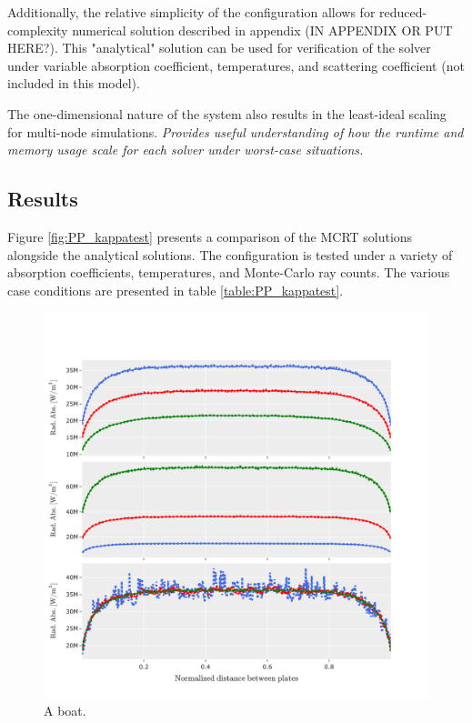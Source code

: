 Additionally, the relative simplicity of the configuration allows for reduced-complexity numerical solution described in appendix (IN APPENDIX OR PUT HERE?). 
This "analytical" solution can be used for verification of the solver under variable absorption coefficient, temperatures, and scattering coefficient (not included in this model).

The one-dimensional nature of the system also results in the least-ideal scaling for multi-node simulations. \textit{Provides useful understanding of how the runtime and memory usage scale for each solver under worst-case situations.}

\subsection{Results}
Figure \ref{fig:PP_kappatest} presents a comparison of the MCRT solutions alongside the analytical solutions. The configuration is tested under a variety of absorption coefficients, temperatures, and Monte-Carlo ray counts. The various case conditions are presented in table \ref{table:PP_kappatest}.

\begin{figure}
  \includegraphics[width=\linewidth]{figures/ch4/PPcomparison.png}
  \caption{A boat.}
  \label{fig:boat1}
\end{figure}

